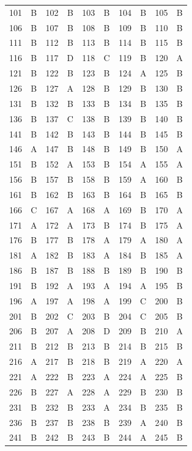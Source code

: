 \begin{longtable}{cc|cc|cc|cc|cc}
101 & B & 102 & B & 103 & B & 104 & B & 105 & B \\
106 & B & 107 & B & 108 & B & 109 & B & 110 & B \\
111 & B & 112 & B & 113 & B & 114 & B & 115 & B \\
116 & B & 117 & D & 118 & C & 119 & B & 120 & A \\
121 & B & 122 & B & 123 & B & 124 & A & 125 & B \\
126 & B & 127 & A & 128 & B & 129 & B & 130 & B \\
131 & B & 132 & B & 133 & B & 134 & B & 135 & B \\
136 & B & 137 & C & 138 & B & 139 & B & 140 & B \\
141 & B & 142 & B & 143 & B & 144 & B & 145 & B \\
146 & A & 147 & B & 148 & B & 149 & B & 150 & A \\
151 & B & 152 & A & 153 & B & 154 & A & 155 & A \\
156 & B & 157 & B & 158 & B & 159 & A & 160 & B \\
161 & B & 162 & B & 163 & B & 164 & B & 165 & B \\
166 & C & 167 & A & 168 & A & 169 & B & 170 & A \\
171 & A & 172 & A & 173 & B & 174 & B & 175 & A \\
176 & B & 177 & B & 178 & A & 179 & A & 180 & A \\
181 & A & 182 & B & 183 & A & 184 & B & 185 & A \\
186 & B & 187 & B & 188 & B & 189 & B & 190 & B \\
191 & B & 192 & A & 193 & A & 194 & A & 195 & B \\
196 & A & 197 & A & 198 & A & 199 & C & 200 & B \\
201 & B & 202 & C & 203 & B & 204 & C & 205 & B \\
206 & B & 207 & A & 208 & D & 209 & B & 210 & A \\
211 & B & 212 & B & 213 & B & 214 & B & 215 & B \\
216 & A & 217 & B & 218 & B & 219 & A & 220 & A \\
221 & A & 222 & B & 223 & A & 224 & A & 225 & B \\
226 & B & 227 & A & 228 & A & 229 & B & 230 & B \\
231 & B & 232 & B & 233 & A & 234 & B & 235 & B \\
236 & B & 237 & B & 238 & B & 239 & A & 240 & B \\
241 & B & 242 & B & 243 & B & 244 & A & 245 & B \\

\end{longtable}
